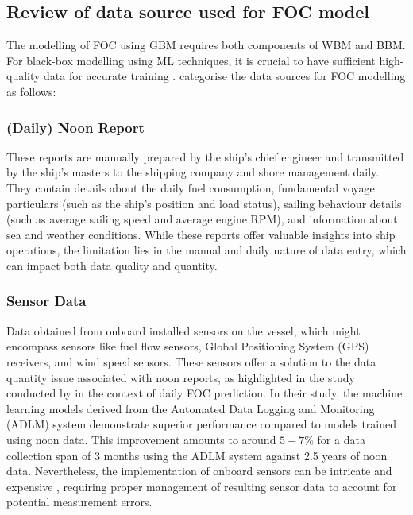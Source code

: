 \pagebreak

\subsection{Review of data source used for FOC model}\label{sec:data_use}

The modelling of FOC using GBM requires both components of WBM and BBM. For black-box modelling using ML techniques, it is crucial to have sufficient high-quality data for accurate training .  categorise the data sources for FOC modelling as follows:
\\

\subsubsection*{\textbf{(Daily) Noon Report}} These reports are manually prepared by the ship's chief engineer and transmitted by the ship's masters to the shipping company and shore management daily. They contain details about the daily fuel consumption, fundamental voyage particulars (such as the ship's position and load status), sailing behaviour details (such as average sailing speed and average engine RPM), and information about sea and weather conditions. While these reports offer valuable insights into ship operations, the limitation lies in the manual and daily nature of data entry, which can impact both data quality and quantity.\\

\subsubsection*{\textbf{Sensor Data}} Data obtained from onboard installed sensors on the vessel, which might encompass sensors like fuel flow sensors, Global Positioning System (GPS) receivers, and wind speed sensors. These sensors offer a solution to the data quantity issue associated with noon reports, as highlighted in the study conducted by  in the context of daily FOC prediction. In their study, the machine learning models derived from the Automated Data Logging and Monitoring (ADLM) system demonstrate superior performance compared to models trained using noon data. This improvement amounts to around $5-7\%$ for a data collection span of 3 months using the ADLM system against 2.5 years of noon data. Nevertheless, the implementation of onboard sensors can be intricate and expensive , requiring proper management of resulting sensor data to account for potential measurement errors.\\


